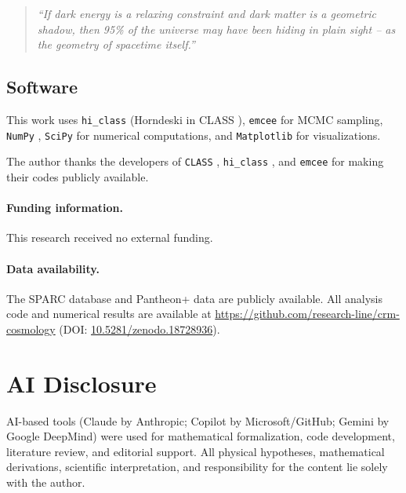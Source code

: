 \documentclass[aps,prd,twocolumn,superscriptaddress,nofootinbib,floatfix]{revtex4-2}
\begin{document}
\begin{quote}
\textit{``If dark energy is a relaxing constraint and dark matter is a geometric shadow, then 95\% of the universe may have been hiding in plain sight -- as the geometry of spacetime itself.''}
\end{quote}


\subsection*{Software}

This work uses \texttt{hi\_class} \cite{Zumalacarregui2017} (Horndeski in CLASS \cite{Blas2011}), \texttt{emcee} \cite{ForemanMackey2013} for MCMC sampling, \texttt{NumPy} \cite{Harris2020}, \texttt{SciPy} \cite{Virtanen2020} for numerical computations, and \texttt{Matplotlib} \cite{Hunter2007} for visualizations.

\begin{acknowledgments}
The author thanks the developers of \texttt{CLASS} \cite{Blas2011},
\texttt{hi\_class} \cite{Zumalacarregui2017}, and
\texttt{emcee} \cite{ForemanMackey2013} for making their codes publicly
available.
\end{acknowledgments}

\paragraph{Funding information.}
This research received no external funding.

\paragraph{Data availability.}
The SPARC database \cite{Lelli2016} and Pantheon+ data \cite{Scolnic2022}
are publicly available. All analysis code and numerical results are
available at \url{https://github.com/research-line/crm-cosmology}
(DOI: \href{https://doi.org/10.5281/zenodo.18728936}{10.5281/zenodo.18728936}).

\section*{AI Disclosure}
AI-based tools (Claude by Anthropic; Copilot by Microsoft/GitHub; Gemini by Google DeepMind) were used for mathematical formalization, code development, literature review, and editorial support. All physical hypotheses, mathematical derivations, scientific interpretation, and responsibility for the content lie solely with the author.
\end{document}
